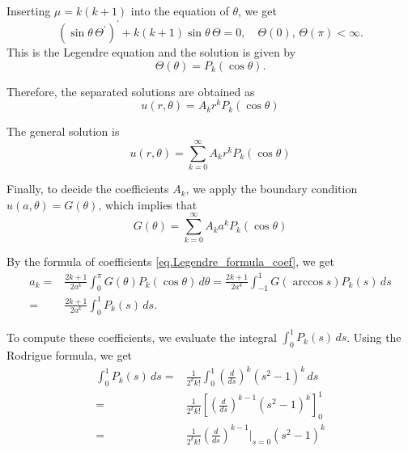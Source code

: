 Inserting $\mu = k(k+1)$ into the equation of $\theta$, we get 
\begin{equation}
    (\sin\theta\,\Theta^{\prime})^{\prime}+k(k+1) \sin\theta\,\Theta=0, \quad \Theta(0),\, \Theta(\pi)  < \infty.
\end{equation}
This is the Legendre equation and the solution is given by 
\begin{equation}
    \Theta(\theta) = P_k(\cos\theta).
\end{equation}

Therefore, the separated solutions are obtained as
\begin{equation}
u(r, \theta)= A_k r^k P_k(\cos\theta)
\end{equation}

The general solution is
$$
u(r, \theta)=\sum_{k = 0}^\infty A_k r^k P_k(\cos\theta)
$$

Finally, to decide the coefficients $A_k$, we apply the boundary condition $u(a, \theta)=G(\theta)$, which implies that 
$$
G(\theta)=\sum_{k = 0}^\infty A_k a^k P_k(\cos\theta)
$$

By the formula of coefficients \eqref{eq.Legendre_formula_coef}, we get 
\[
\begin{split}
    a_k =& \frac{2k + 1}{2a^k} \int_0^\pi G(\theta) P_k(\cos \theta) \, d\theta = \frac{2k + 1}{2a^k} \int_{-1}^1 G(\arccos s) P_k(s) \, ds
    \\
    =&\frac{2k + 1}{2a^k} \int_0^1 P_k(s) \, ds.
\end{split}
\]

To compute these coefficients, we evaluate the integral $\int_0^1 P_k(s) \, ds$. Using the Rodrigue formula, we get 
\[
\begin{split}
    \int_0^1 P_{k}(s) \, ds =& \frac{1}{2^{k} k!} \int_0^1 \left(\frac{d}{d s}\right)^{k}\left(s^2-1\right)^{k} \, ds 
    \\
    =& \frac{1}{2^{k} k!} \left[\left(\frac{d}{d s}\right)^{k-1}\left(s^2-1\right)^{k}\right]_0^1 
    \\
    =& \frac{1}{2^{k} k!} \left(\frac{d}{d s}\right)^{k-1}\bigg|_{s = 0}\left(s^2-1\right)^{k}
\end{split}
\]

